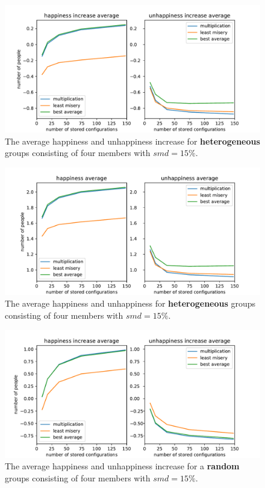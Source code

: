 \begin{figure}
    \centering
    \includegraphics[width=1\textwidth]{./figures/60_evaluation/heterogeneous_happy_unhappy_increase_amount-1000_smd-15.pdf}
    \caption{The average happiness and unhappiness increase for \textbf{heterogeneous} groups consisting of four members with $smd=15\%$.}
    \label{fig:Evaluation:HeterogenousGroupIncrease}
\end{figure}

\begin{figure}
    \centering
    \includegraphics[width=1\textwidth]{./figures/60_evaluation/heterogeneous_happy_unhappy_total_group_amount-1000_smd-15.pdf}
    \caption{The average happiness and unhappiness for \textbf{heterogeneous} groups consisting of four members with $smd=15\%$.}
    \label{fig:Evaluation:HeterogenousGroupTotal}
\end{figure}

\begin{figure}
    \centering
    \includegraphics[width=1\textwidth]{./figures/60_evaluation/random_happy_unhappy_increase_amount-1000_smd-15.pdf}
    \caption{The average happiness and unhappiness increase for a \textbf{random} groups consisting of four members with $smd=15\%$.}
    \label{fig:Evaluation:RandomGroupIncrease}
\end{figure}

